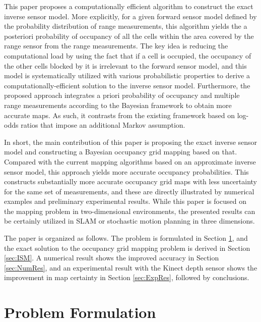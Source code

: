 \documentclass[letterpaper, 10pt, conference]{ieeeconf}
\begin{document}
This paper proposes a computationally efficient algorithm to construct the exact inverse sensor model. More explicitly, for a given forward sensor model defined by the probability distribution of range measurements, this algorithm yields the a posteriori probability of occupancy of all the cells within the area covered by the range sensor from the range measurements. The key idea is reducing the computational load by using the fact that if a cell is occupied, the occupancy of the other cells blocked by it is irrelevant to the forward sensor model, and this model is systematically utilized with various probabilistic properties to derive a computationally-efficient solution to the inverse sensor model. Furthermore, the proposed approach integrates a priori probability of occupancy and multiple range measurements according to the Bayesian framework to obtain more accurate maps. As such, it contrasts from the existing framework based on log-odds ratios that impose an additional Markov assumption. 


In short, the main contribution of this paper is proposing the exact inverse sensor model and constructing a Bayesian occupancy grid mapping based on that. Compared with the current mapping algorithms based on an approximate inverse sensor model, this approach yields more accurate occupancy probabilities. This constructs substantially more accurate occupancy grid maps with less uncertainty for the same set of measurements, and these are directly illustrated by numerical examples and preliminary experimental results. While this paper is focused on the mapping problem in two-dimensional environments, the presented results can be certainly utilized in SLAM or stochastic motion planning in three dimensions.



The paper is organized as follows.
The problem is formulated in Section \ref{sec:ProbForm}, and the exact solution to the occupancy grid mapping problem is derived in Section \ref{sec:ISM}.
A numerical result shows the improved accuracy in Section \ref{sec:NumRes}, and an experimental result with the Kinect depth sensor shows the improvement in map certainty in Section \ref{sec:ExpRes}, followed by conclusions.


\section{Problem Formulation}
\label{sec:ProbForm}
\end{document}

